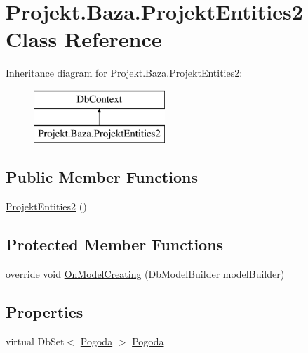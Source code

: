 \hypertarget{class_projekt_1_1_baza_1_1_projekt_entities2}{}\section{Projekt.\+Baza.\+Projekt\+Entities2 Class Reference}
\label{class_projekt_1_1_baza_1_1_projekt_entities2}
Inheritance diagram for Projekt.\+Baza.\+Projekt\+Entities2\+:\begin{figure}[H]
\begin{center}
\leavevmode
\includegraphics[height=2.000000cm]{class_projekt_1_1_baza_1_1_projekt_entities2}
\end{center}
\end{figure}
\subsection*{Public Member Functions}
\begin{DoxyCompactItemize}
\item 
\mbox{\hyperlink{class_projekt_1_1_baza_1_1_projekt_entities2_a33fd8a0eec32ef14a23dc2cf4ef09ec5}{Projekt\+Entities2}} ()
\end{DoxyCompactItemize}
\subsection*{Protected Member Functions}
\begin{DoxyCompactItemize}
\item 
override void \mbox{\hyperlink{class_projekt_1_1_baza_1_1_projekt_entities2_a330be8254f73dda676825600226cb961}{On\+Model\+Creating}} (Db\+Model\+Builder model\+Builder)
\end{DoxyCompactItemize}
\subsection*{Properties}
\begin{DoxyCompactItemize}
\item 
virtual Db\+Set$<$ \mbox{\hyperlink{class_projekt_1_1_baza_1_1_pogoda}{Pogoda}} $>$ \mbox{\hyperlink{class_projekt_1_1_baza_1_1_projekt_entities2_af0406b625d7b786a063dc8ec032b8835}{Pogoda}}
\end{DoxyCompactItemize}


